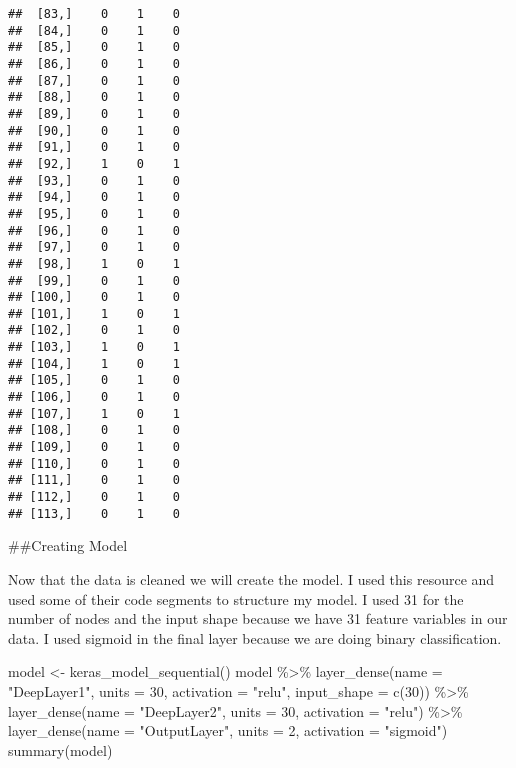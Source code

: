 \documentclass[
]{article}
\newenvironment{Shaded}{\begin{snugshade}}{\end{snugshade}}
\newcommand{\AttributeTok}[1]{\textcolor[rgb]{0.77,0.63,0.00}{#1}}
\newcommand{\DecValTok}[1]{\textcolor[rgb]{0.00,0.00,0.81}{#1}}
\newcommand{\FunctionTok}[1]{\textcolor[rgb]{0.00,0.00,0.00}{#1}}
\newcommand{\NormalTok}[1]{#1}
\newcommand{\OtherTok}[1]{\textcolor[rgb]{0.56,0.35,0.01}{#1}}
\newcommand{\SpecialCharTok}[1]{\textcolor[rgb]{0.00,0.00,0.00}{#1}}
\newcommand{\StringTok}[1]{\textcolor[rgb]{0.31,0.60,0.02}{#1}}
\begin{document}
\begin{verbatim}
##  [83,]    0    1    0
##  [84,]    0    1    0
##  [85,]    0    1    0
##  [86,]    0    1    0
##  [87,]    0    1    0
##  [88,]    0    1    0
##  [89,]    0    1    0
##  [90,]    0    1    0
##  [91,]    0    1    0
##  [92,]    1    0    1
##  [93,]    0    1    0
##  [94,]    0    1    0
##  [95,]    0    1    0
##  [96,]    0    1    0
##  [97,]    0    1    0
##  [98,]    1    0    1
##  [99,]    0    1    0
## [100,]    0    1    0
## [101,]    1    0    1
## [102,]    0    1    0
## [103,]    1    0    1
## [104,]    1    0    1
## [105,]    0    1    0
## [106,]    0    1    0
## [107,]    1    0    1
## [108,]    0    1    0
## [109,]    0    1    0
## [110,]    0    1    0
## [111,]    0    1    0
## [112,]    0    1    0
## [113,]    0    1    0
\end{verbatim}

\#\#Creating Model

Now that the data is cleaned we will create the model. I used this
resource and used some of their code segments to structure my model. I
used 31 for the number of nodes and the input shape because we have 31
feature variables in our data. I used sigmoid in the final layer because
we are doing binary classification.

\begin{Shaded}
\begin{Highlighting}[]
\NormalTok{model }\OtherTok{\textless{}{-}} \FunctionTok{keras\_model\_sequential}\NormalTok{()}
\NormalTok{model }\SpecialCharTok{\%\textgreater{}\%} 
  \FunctionTok{layer\_dense}\NormalTok{(}\AttributeTok{name =} \StringTok{"DeepLayer1"}\NormalTok{,}
              \AttributeTok{units =} \DecValTok{30}\NormalTok{,}
              \AttributeTok{activation =} \StringTok{"relu"}\NormalTok{,}
              \AttributeTok{input\_shape =} \FunctionTok{c}\NormalTok{(}\DecValTok{30}\NormalTok{)) }\SpecialCharTok{\%\textgreater{}\%} 
  \FunctionTok{layer\_dense}\NormalTok{(}\AttributeTok{name =} \StringTok{"DeepLayer2"}\NormalTok{,}
              \AttributeTok{units =} \DecValTok{30}\NormalTok{,}
              \AttributeTok{activation =} \StringTok{"relu"}\NormalTok{) }\SpecialCharTok{\%\textgreater{}\%} 
  \FunctionTok{layer\_dense}\NormalTok{(}\AttributeTok{name =} \StringTok{"OutputLayer"}\NormalTok{,}
              \AttributeTok{units =} \DecValTok{2}\NormalTok{,}
              \AttributeTok{activation =} \StringTok{"sigmoid"}\NormalTok{)}
\FunctionTok{summary}\NormalTok{(model)}
\end{Highlighting}
\end{Shaded}
\end{document}
